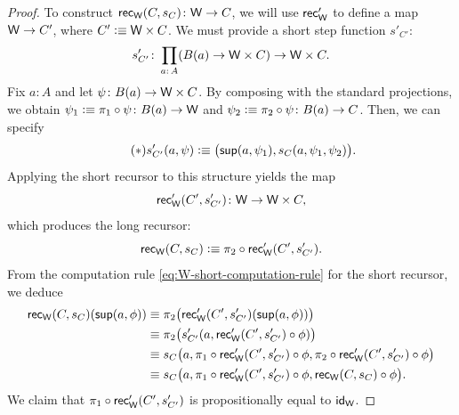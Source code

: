 \begin{proof}
    To construct $\fun{rec}_{\fun W}(C,s_C)\colon\fun W\to C$, we will use $\mathsf{rec}'_{\mathsf{W}}$ to define a map $\mathsf{W}\to C'$, where $C'\mathrel{\vcentcolon}\equiv\mathsf{W}\times C$. We must provide a short step function $s'_{C'}$:
    \[
        s'_{C'}\colon\prod_{a\colon A}
            (B(a)\to\fun W\times C)\to\fun W\times C.
    \]
    Fix $a\colon A$ and let $\psi\colon B(a)\to\fun W\times C$. By composing with the standard projections, we obtain $\psi_1\defeq\pi_1\circ\psi\colon B(a)\to\fun W$ and $\psi_2\defeq\pi_2\circ\psi\colon B(a)\to C$. Then, we can specify
    \[\tag{$\ast$}
        s'_{C'}(a,\psi)\mathrel{\vcentcolon}\equiv
            \bigl(
                \mathsf{sup}(a,\psi_1),s_C(a,\psi_1,\psi_2)
            \bigr).
    \]
    Applying the short recursor to this structure yields the map
    \[
        \fun{rec}'_{\fun W}(C',s'_{C'})\colon
            \fun W\to\fun W\times C,
    \]
    which produces the long recursor:
    \[
        \mathsf{rec}_{\mathsf{W}}(C,s_C)
            \mathrel{\vcentcolon}\equiv\pi_2\circ\mathsf{rec}'_{\mathsf{W}}(C',s'_{C'}).
    \]
    From the computation rule \eqref{eq:W-short-computation-rule} for the short recursor, we deduce
    \begin{align*}
        \mathsf{rec}_{\mathsf{W}}(C,s_C)(\mathsf{sup}(a,\phi))
            &\equiv\pi_2
                \bigl(
                    \mathsf{rec}'_{\mathsf{W}}(C',s'_{C'})
                        (\mathsf{sup}(a,\phi))
                \bigr)\\
            &\equiv\pi_2
                \bigl(
                    s'_{C'}(
                        a,
                        \mathsf{rec}'_{\mathsf{W}}(C',s'_{C'})
                            \circ\phi
                )\bigr)\\
            &\equiv s_C
                \bigl(
                    a,
                    \pi_1\circ\mathsf{rec}'_{\mathsf{W}}
                        (C',s'_{C'})\circ\phi,
                     \pi_2\circ\mathsf{rec}'_{\mathsf{W}}
                        (C',s'_{C'})\circ\phi
                \bigr)\\
            &\equiv s_C
                \bigl(
                    a,
                    \pi_1\circ\mathsf{rec}'_{\mathsf{W}}(C',s'_{C'})
                        \circ\phi,
                    \mathsf{rec}_{\mathsf{W}}(C,s_C)\circ\phi
                \bigr).
    \end{align*}
    We claim that $\pi_1\circ\mathsf{rec}'_{\mathsf{W}}(C',s'_{C'})$ is propositionally equal to $\mathsf{id}_{\mathsf{W}}$.
    

\end{proof}
